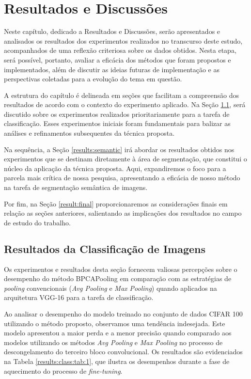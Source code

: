 \newpage
\clearpage

\section{Resultados e Discussões}
\label{results}
Neste capítulo, dedicado a Resultados e Discussões, serão apresentados e analisados os resultados dos experimentos realizados no transcurso deste estudo, acompanhados de uma reflexão criteriosa sobre os dados obtidos. Nesta etapa, será possível, portanto, avaliar a eficácia dos métodos que foram propostos e implementados, além de discutir as ideias futuras de implementação e as perspectivas coletadas para a evolução do tema em questão.

A estrutura do capítulo é delineada em seções que facilitam a compreensão dos resultados de acordo com o contexto do experimento aplicado. Na Seção \ref{results:class}, será discutido sobre os experimentos realizados prioritariamente para a tarefa de classificação. Esses experimentos iniciais foram fundamentais para balizar as análises e refinamentos subsequentes da técnica proposta.

Na sequência, a Seção \ref{results:semantic} irá abordar os resultados obtidos nos experimentos que se destinam diretamente à área de segmentação, que constitui o núcleo da aplicação da técnica proposta. Aqui, expandiremos o foco para a parcela mais crítica de nossa pesquisa, apresentando a eficácia de nosso método na tarefa de segmentação semântica de imagens.

Por fim, na Seção \ref{result:final} proporcionaremos as considerações finais em relação as seções anteriores, salientando as implicações dos resultados no campo de estudo do trabalho.

\subsection{Resultados da Classificação de Imagens}
\label{results:class}
Os experimentos e resultados desta seção fornecem valiosas percepções sobre o desempenho do método BPCAPooling em comparação com as estratégias de \textit{pooling} convencionais (\textit{Avg Pooling} e \textit{Max Pooling}) \citep{Ozdemir2023Avg-topk:Networks} quando aplicados na arquitetura VGG-16 para a tarefa de classificação.

Ao analisar o desempenho do modelo treinado no conjunto de dados CIFAR 100 utilizando o método proposto, observamos uma tendência indesejada. Este modelo apresentou a maior perda e a menor precisão quando comparado aos modelos utilizando os métodos \textit{Avg Pooling} e \textit{Max Pooling} no processo de descongelamento do terceiro bloco convolucional. Os resultados são evidenciados na Tabela \ref{results:class:tab:1}, que ilustra os desempenhos durante a fase de aquecimento do processo de \textit{fine-tuning}.

